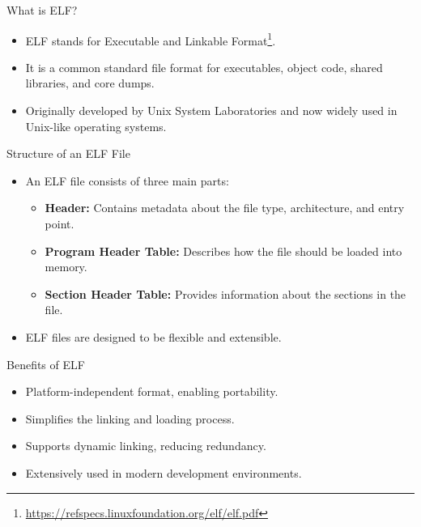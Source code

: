 \begin{frame}{What is ELF?}
    \begin{itemize}
        \item ELF stands for Executable and Linkable Format\footnote{\url{https://refspecs.linuxfoundation.org/elf/elf.pdf}}.
        \item It is a common standard file format for executables, object code, shared libraries, and core dumps.
        \item Originally developed by Unix System Laboratories and now widely used in Unix-like operating systems.
    \end{itemize}
\end{frame}

\begin{frame}{Structure of an ELF File}
    \begin{itemize}
        \item An ELF file consists of three main parts:
        \begin{itemize}
            \item \textbf{Header:} Contains metadata about the file type, architecture, and entry point.
            \item \textbf{Program Header Table:} Describes how the file should be loaded into memory.
            \item \textbf{Section Header Table:} Provides information about the sections in the file.
        \end{itemize}
        \item ELF files are designed to be flexible and extensible.
    \end{itemize}
\end{frame}

\begin{frame}{Benefits of ELF}
    \begin{itemize}
        \item Platform-independent format, enabling portability.
        \item Simplifies the linking and loading process.
        \item Supports dynamic linking, reducing redundancy.
        \item Extensively used in modern development environments.
    \end{itemize}
\end{frame}

